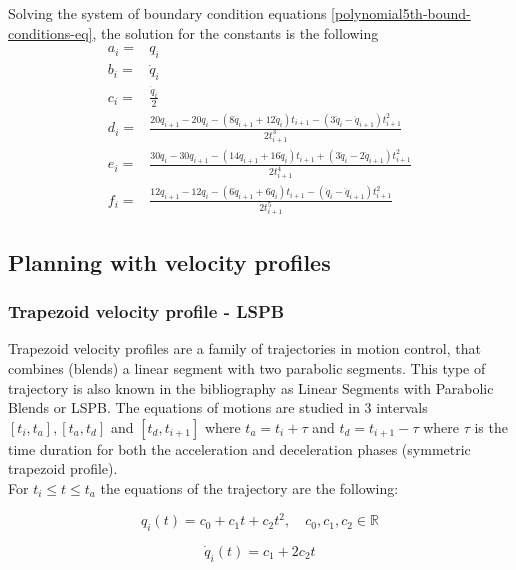 Solving the system of boundary condition equations \ref{polynomial5th-bound-conditions-eq}, the solution for the constants is the following
\begin{equation}
\begin{aligned}
a_i ={}& q_i \\
b_i ={}& \dot{q}_i \\
c_i ={}& \frac{\ddot{q}_i}{2} \\
d_i ={}& \frac{20q_{i+1} - 20q_i - (8\dot{q}_{i+1} + 12\dot{q}_i)t_{i+1} - (3\ddot{q}_i - \ddot{q}_{i+1})t_{i+1}^2 }{2t_{i+1}^3} \\
e_i ={}& \frac{30q_i - 30q_{i+1} - (14\dot{q}_{i+1} + 16\dot{q}_i)t_{i+1} + (3\ddot{q}_i - 2\ddot{q}_{i+1})t_{i+1}^2}{2t_{i+1}^4} \\
f_i ={}& \frac{12q_{i+1} - 12q_i - (6\dot{q}_{i+1} + 6\dot{q}_i)t_{i+1} - (\ddot{q}_i - \ddot{q}_{i+1})t_{i+1}^2 }{2t_{i+1}^5}
\end{aligned}
\end{equation}


\subsection{Planning with velocity profiles}

\subsubsection{Trapezoid velocity profile - LSPB}

Trapezoid velocity profiles are a family of trajectories in motion control, that combines (blends) a linear segment with two parabolic segments. This type of trajectory is also known in the bibliography as 
Linear Segments with Parabolic Blends or LSPB. The equations of motions are studied in 3 intervals $[t_i, t_a], [t_a, t_d]$ and $[t_d, t_{i+1}]$ where $t_a = t_i + τ$ and $t_d = t_{i+1} - τ$ where $τ$ is 
the time duration for both the acceleration and deceleration phases (symmetric trapezoid profile). \\

For $t_i \leq t \leq t_a$ the equations of the trajectory are the following:

\begin{equation}
q_i(t) = c_0 + c_1t + c_2t^2, \quad c_0,c_1,c_2 \in \mathbb{R}
\end{equation}

\begin{equation}
\dot{q}_i(t) = c_1 + 2c_2t
\end{equation}

